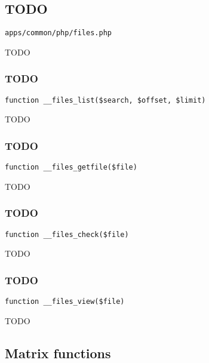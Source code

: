 \documentclass[a4paper]{article}
\begin{document}
\hypertarget{toc29}{}
\subsection{TODO}

\begin{lstlisting}
apps/common/php/files.php
\end{lstlisting}

TODO

\hypertarget{toc30}{}
\subsubsection{TODO}

\begin{lstlisting}
function __files_list($search, $offset, $limit)
\end{lstlisting}

TODO

\hypertarget{toc31}{}
\subsubsection{TODO}

\begin{lstlisting}
function __files_getfile($file)
\end{lstlisting}

TODO

\hypertarget{toc32}{}
\subsubsection{TODO}

\begin{lstlisting}
function __files_check($file)
\end{lstlisting}

TODO

\hypertarget{toc33}{}
\subsubsection{TODO}

\begin{lstlisting}
function __files_view($file)
\end{lstlisting}

TODO

\hypertarget{toc34}{}
\subsection{Matrix functions}
\end{document}
